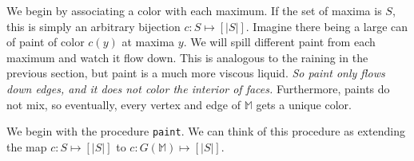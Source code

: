 \documentclass[11pt]{article}
\theoremstyle{definition}
\newcommand{\MM}{\mathbb{M}}
\newcommand{\paint}{{\tt paint}}
\begin{document}
We begin by associating a color with each maximum. If the set of maxima is $S$,
this is simply an arbitrary bijection $c:S \mapsto [|S|]$. Imagine there being a large
can of paint of color $c(y)$ at maxima $y$. We will spill different paint from each maximum and watch it flow down.
This is analogous to the raining in the previous section, but paint is a much more viscous liquid.
\emph{So paint only flows down edges, and it does not color the interior of faces.} Furthermore, paints
do not mix, so eventually, every vertex and edge of $\MM$ gets a unique color.

We begin with the procedure \paint. We can think of this procedure as extending the map $c:S \mapsto [|S|]$
to $c:G(\MM) \mapsto [|S|]$.
\end{document}

